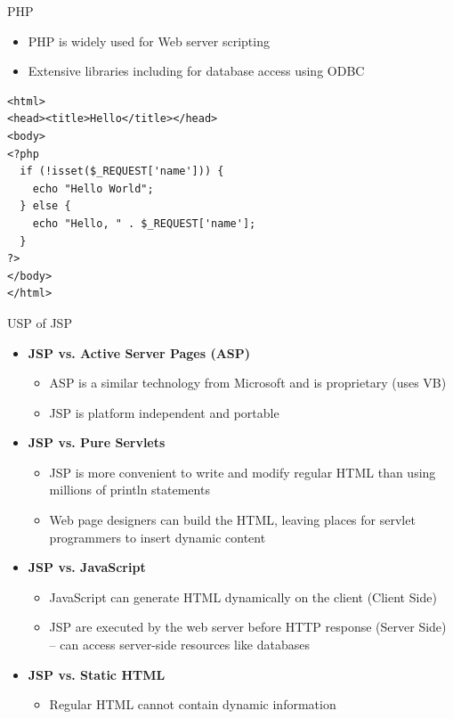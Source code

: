 \documentclass[aspectratio=169, xcolor=dvipsnames]{beamer}
\begin{document}
\begin{frame}[fragile]{PHP}
    \begin{itemize}
        \item PHP is widely used for Web server scripting
        \item Extensive libraries including for database access using ODBC
    \end{itemize}
    \begin{verbatim}
<html>
<head><title>Hello</title></head>
<body>
<?php
  if (!isset($_REQUEST['name'])) {
    echo "Hello World";
  } else {
    echo "Hello, " . $_REQUEST['name'];
  }
?>
</body>
</html>
    \end{verbatim}
\end{frame}

\begin{frame}{USP of JSP}
    \begin{itemize}[<+->]
        \item \textbf{JSP vs. Active Server Pages (ASP)}
        \begin{itemize}
            \item[$\triangleright$] ASP is a similar technology from Microsoft and is proprietary (uses VB)
            \item[$\triangleright$] JSP is platform independent and portable
        \end{itemize}
        \item \textbf{JSP vs. Pure Servlets}
        \begin{itemize}
            \item[$\triangleright$] JSP is more convenient to write and modify regular HTML than using millions of println statements
            \item[$\triangleright$] Web page designers can build the HTML, leaving places for servlet programmers to insert dynamic content
        \end{itemize}
        \item \textbf{JSP vs. JavaScript}
        \begin{itemize}
            \item[$\triangleright$] JavaScript can generate HTML dynamically on the client (Client Side)
            \item[$\triangleright$] JSP are executed by the web server before HTTP response (Server Side) -- can access server-side resources like databases
        \end{itemize}
        \item \textbf{JSP vs. Static HTML}
        \begin{itemize}
            \item[$\triangleright$] Regular HTML cannot contain dynamic information
        \end{itemize}
    \end{itemize}
\end{frame}
\end{document}
